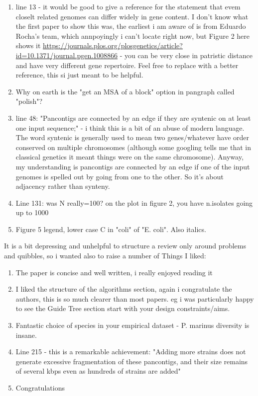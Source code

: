 \documentclass{article}
\begin{document}
\begin{enumerate}
    \item line 13 - it would be good to give a reference for the statement that evem closelt related genomes can differ widely in gene content.
          I don't know what the first paper to show this was, the earliest i am aware of is from Eduardo Rocha's team, which annpoyingly i can't locate right now, but Figure 2 here shows it \url{https://journals.plos.org/plosgenetics/article?id=10.1371/journal.pgen.1008866} - you can be very close in patristic distance and have very different gene repertoire.
          Feel free to replace with a better reference, this si just meant to be helpful.

    \item Why on earth is the "get an MSA of a block" option in pangraph called "polish"?

    \item line 48: "Pancontigs are connected by an edge if they are syntenic on at least one input sequence;" - i think this is a bit of an abuse of modern language. The word syntenic is generally used to mean two genes/whatever have order conserved on multiple chromosomes (although some googling tells me that in classical genetics it meant things were on the same chromosome). Anyway, my understanding is pancontigs are connected by an edge if one of the input genomes is spelled out by going from one to the other. So it's about adjacency rather than synteny.

    \item Line 131: was N really=100? on the plot in figure 2, you have n.isolates going up to 1000

    \item Figure 5 legend, lower case C in "coli" of "E. coli". Also italics.
\end{enumerate}


It is a bit depressing and unhelpful to structure a review only around problems and quibbles, so i wanted also to raise a number of
Things I liked:

\begin{enumerate}
    \item The paper is concise and well written, i really enjoyed reading it
    \item I liked the structure of the algorithms section, again i congratulate the authors, this is so much clearer than most papers. eg i was particularly happy to see the Guide Tree section start with your design constraints/aims.
    \item Fantastic choice of species in your empirical dataset - P. marinus diversity is insane.
    \item Line 215 - this is a remarkable achievement: "Adding more strains does not generate excessive fragmentation of these pancontigs, and their size remains of several kbps even as hundreds of strains are added"
    \item Congratulations
\end{enumerate}
\end{document}
